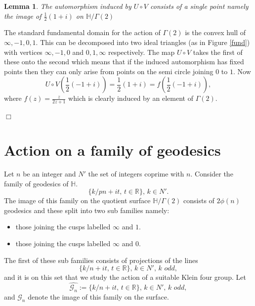 \documentclass[12pt,a4paper]{amsart}
\newtheorem{lem}[thm]{Lemma}
\def\HH{\mathbb{H}}
\def\xx{\HH/g2}
\def\RR{\mathbb{R}}
\def\g2{\Gamma(2)}
\def\xx{\HH/\g2}
\def\gg{\mathcal{G}_n}
\begin{document}
\begin{lem}
The automorphism induced by $U\circ V$ consists of a single point
namely the image of $\frac{1}{2 }(1+ i)$ on $\xx$
\end{lem}

\proof The standard  fundamental domain for the action of $\g2$ 
is the convex hull of $\infty, -1, 0 , 1$.
This can be decomposed into two ideal triangles (as in Figure \ref{fund})
with vertices $\infty, -1, 0 $ and $ 0 , 1,\infty$ respectively.
The map  $U\circ V$ takes the first of these onto the second
which means that
if the induced automorphism has fixed points then 
they can only arise from points on the semi circle joining $0$ to $1$.
Now
$$U\circ V \left(\frac{1}{2 }(-1+ i) \right)  = \frac{1}{2 }(1+ i) = f \left(\frac{1}{2 }(-1+ i) \right),$$
where $f(z) = \frac{z}{2z + 1}$ which  is clearly induced by an element of $\g2$.

\hfill $\Box$

%


\section{Action on a family of geodesics}

Let $n$ be an integer and 
$N'$  the set of integers coprime with $n$.
Consider the family of geodesics of $\HH$.
$$\{  k/pn+ i t,\, t \in \RR \},\, k \in N'.$$
The image of this family on the quotient surface $\xx$ consists
of $2\phi(n)$ geodesics 
and these split into two sub families namely:
\begin{itemize}
\item those joining the cusps labelled $\infty$ and $1$.
\item those joining the cusps labelled $\infty$ and $0$.
\end{itemize}
The first of these sub families consists of projections of the lines
$$ \{  k/n+ i t,\, t \in \RR \},\, k \in N',\, \textit{k odd},$$
and it is on this set that we study the action of a suitable Klein four group.
Let 
$$\hat{\gg} :=  \{  k/n+ i t,\, t \in \RR \},\, k \in N',\, \textit{k odd},$$
and  $\gg$  denote the image of this family on the surface.
\end{document}
